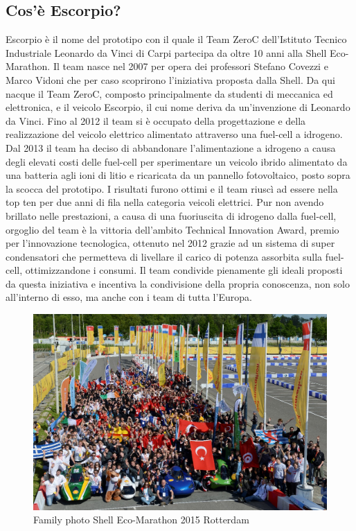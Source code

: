\documentclass[12pt,a4paper]{article}
\begin{document}
\subsection{Cos'è Escorpio?}
Escorpio è il nome del prototipo con il quale il Team ZeroC dell’Istituto Tecnico Industriale Leonardo da Vinci di Carpi partecipa da oltre 10 anni alla Shell Eco-Marathon. Il team nasce nel 2007 per opera dei professori Stefano Covezzi e Marco Vidoni che per caso scoprirono l’iniziativa proposta dalla Shell. Da qui nacque il Team ZeroC, composto principalmente da studenti di meccanica ed elettronica, e il veicolo Escorpio, il cui nome deriva da un’invenzione di Leonardo da Vinci. Fino al 2012 il team si è occupato della progettazione e della realizzazione del veicolo elettrico alimentato attraverso una fuel-cell a idrogeno. 
Dal 2013 il team ha deciso di abbandonare l’alimentazione a idrogeno a causa degli elevati costi delle fuel-cell per sperimentare un veicolo ibrido alimentato da una batteria agli ioni di litio e ricaricata da un pannello fotovoltaico, posto sopra la scocca del prototipo. I risultati furono ottimi e il team riuscì ad essere nella top ten per due anni di fila nella categoria veicoli elettrici.
Pur non avendo brillato nelle prestazioni, a causa di una fuoriuscita di idrogeno dalla fuel-cell, orgoglio del team è la vittoria dell’ambito Technical Innovation Award, premio per l’innovazione tecnologica, ottenuto nel 2012 grazie ad un sistema di super condensatori che permetteva di livellare il carico di potenza assorbita sulla fuel-cell, ottimizzandone i consumi. 
Il team condivide pienamente gli ideali proposti da questa iniziativa e incentiva la condivisione della propria conoscenza, non solo all’interno di esso, ma anche con i team di tutta l’Europa.
\newpage

\begin{figure}
\hfill \includegraphics[scale=0.95]{foto1}
\caption{Family photo Shell Eco-Marathon 2015 Rotterdam}
\end{figure}
\end{document}
